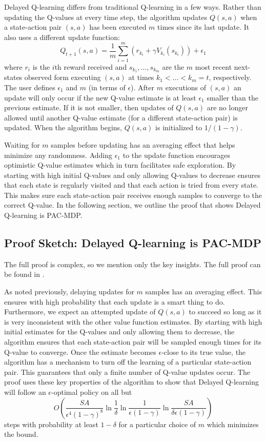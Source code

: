 \documentclass{article} %
\begin{document}
Delayed Q-learning differs from traditional Q-learning in a few ways.  Rather than updating the Q-values at every time step, the algorithm updates $Q(s,a)$ when a state-action pair $(s,a)$ has been executed $m$ times since its last update.  It also uses a different update function:
$$Q_{t+1}(s,a) = \frac{1}{m}\sum_{i=1}^m(r_{k_i}+\gamma V_{k_i}(s_{k_i})) + \epsilon_1$$  
where $r_i$ is the $i$th reward received and $s_{k_1},\dots,s_{k_m}$ are the $m$ most recent next-states observed form executing $(s,a)$ at times $k_1 < \dots < k_m = t$, respectively. The user defines $\epsilon_1$ and $m$ (in terms of $\epsilon$).  After $m$ executions of $(s,a)$ an update will only occur if the new Q-value estimate is at least $\epsilon_1$ smaller than the previous estimate.  If it is not smaller, then updates of $Q(s,a)$ are no longer allowed until another Q-value estimate (for a different state-action pair) is updated.  When the algorithm begins, $Q(s,a)$ is initialized to $1/(1-\gamma)$.

Waiting for $m$ samples before updating has an averaging effect that helps minimize any randomness. Adding $\epsilon_1$ to the update function encourages optimistic Q-value estimates which in turn facilitates safe exploration. By starting with high initial Q-values and only allowing Q-values to decrease ensures that each state is regularly visited and that each action is tried from every state.  This makes sure each state-action pair receives enough samples to converge to the correct Q-value.  In the following section, we outline the proof that shows Delayed Q-learning is PAC-MDP.


\subsection{Proof Sketch: Delayed Q-learning is PAC-MDP}

The full proof is complex, so we mention only the key insights.  The full proof can be found in \cite{strehl_pac_2006}.  

As noted previously, delaying updates for $m$ samples has an averaging effect.  This ensures with high probability that each update is a smart thing to do.  Furthermore, we expect an attempted update of $Q(s,a)$ to succeed so long as it is very inconsistent with the other value function estimates.  By starting with high initial estimates for the Q-values and only allowing them to decrease, the algorithm ensures that each state-action pair will be sampled enough times for its Q-value to converge.  Once the estimate becomes $\epsilon$-close to its true value, the algorithm has a mechanism to turn off the learning of a particular state-action pair.  This guarantees that only a finite number of Q-value updates occur.  The proof uses these key properties of the algorithm to show that Delayed Q-learning will follow an $\epsilon$-optimal policy on all but $$O\left(\frac{SA}{\epsilon^4(1-\gamma)^8}\ln{\frac{1}{\delta}}\ln{\frac{1}{\epsilon(1-\gamma)}}\ln{\frac{SA}{\delta\epsilon(1-\gamma)}}\right)$$ steps with probability at least $1-\delta$ for a particular choice of $m$ which minimizes the bound.
\end{document}
